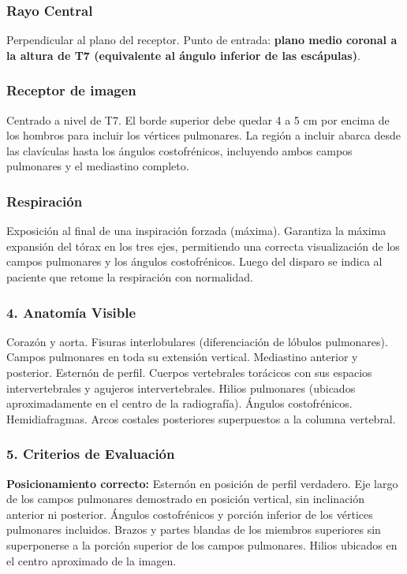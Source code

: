 \subsubsection*{Rayo Central}
Perpendicular al plano del receptor. Punto de entrada: \textbf{plano medio coronal a la altura de T7 (equivalente al ángulo inferior de las escápulas)}.

\subsubsection*{Receptor de imagen}
Centrado a nivel de T7. El borde superior debe quedar 4 a 5 cm por encima de los hombros para incluir los vértices pulmonares. La región a incluir abarca desde las clavículas hasta los ángulos costofrénicos, incluyendo ambos campos pulmonares y el mediastino completo.

\subsubsection*{Respiración}
Exposición al final de una inspiración forzada (máxima). Garantiza la máxima expansión del tórax en los tres ejes, permitiendo una correcta visualización de los campos pulmonares y los ángulos costofrénicos. Luego del disparo se indica al paciente que retome la respiración con normalidad.

\subsubsection*{4. Anatomía Visible}

Corazón y aorta. Fisuras interlobulares (diferenciación de lóbulos pulmonares). Campos pulmonares en toda su extensión vertical. Mediastino anterior y posterior. Esternón de perfil. Cuerpos vertebrales torácicos con sus espacios intervertebrales y agujeros intervertebrales. Hilios pulmonares (ubicados aproximadamente en el centro de la radiografía). Ángulos costofrénicos. Hemidiafragmas. Arcos costales posteriores superpuestos a la columna vertebral.

\subsubsection*{5. Criterios de Evaluación}

\textbf{Posicionamiento correcto:} Esternón en posición de perfil verdadero. Eje largo de los campos pulmonares demostrado en posición vertical, sin inclinación anterior ni posterior. Ángulos costofrénicos y porción inferior de los vértices pulmonares incluidos. Brazos y partes blandas de los miembros superiores sin superponerse a la porción superior de los campos pulmonares. Hilios ubicados en el centro aproximado de la imagen.

